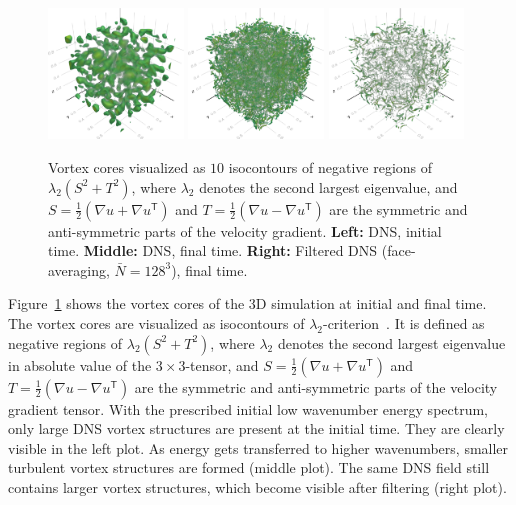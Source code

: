 \documentclass[preprint]{elsarticle}
\begin{document}
\begin{figure}
    \centering
    \includegraphics[width=0.32\textwidth]{figures_prioranalysis_lambda2_Re2000_start.png}
    \includegraphics[width=0.32\textwidth]{figures_prioranalysis_lambda2_Re2000_end.png}
    \includegraphics[width=0.32\textwidth]{figures_prioranalysis_lambda2_Re2000_end_filtered.png}
    \caption{
        Vortex cores visualized as $10$ isocontours of negative regions of
        $\lambda_2(S^2 + T^2)$, where $\lambda_2$ denotes the second largest
        eigenvalue, and $S = \frac{1}{2} (\nabla u + \nabla u^\mathsf{T})$ and
        $T = \frac{1}{2} (\nabla u - \nabla u^\mathsf{T})$ are the symmetric and
        anti-symmetric parts of the velocity gradient. \textbf{Left:} DNS,
        initial time. \textbf{Middle:} DNS, final time. \textbf{Right:} Filtered DNS
        (face-averaging, $\bar{N} = 128^3$),
        final time.
    }
    \label{fig:priorfields_3D}
\end{figure}

Figure~\ref{fig:priorfields_3D} shows the vortex cores of the 3D simulation at
initial and final time. The vortex cores are visualized as isocontours of
$\lambda_2$-criterion~\cite{Jeong1995}. It is defined as negative regions of
$\lambda_2(S^2 + T^2)$, where $\lambda_2$ denotes the second largest eigenvalue
in absolute value of the $3 \times 3$-tensor, and
$S = \frac{1}{2} (\nabla u + \nabla u^\mathsf{T})$ and
$T = \frac{1}{2} (\nabla u - \nabla u^\mathsf{T})$ are
the symmetric and anti-symmetric parts of the velocity gradient tensor.
With the prescribed initial low wavenumber energy spectrum, only large DNS
vortex structures are present at the initial time. They are clearly visible in
the left plot. As energy gets transferred to higher wavenumbers, smaller
turbulent vortex structures are formed (middle plot). The same DNS field still
contains larger vortex structures, which become visible after filtering (right
plot).
\end{document}
